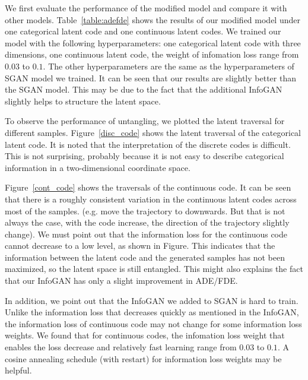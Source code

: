 We first evaluate the performance of the modified model and compare it with other models. Table~\ref{table:adefde} shows the results of our modified model under one categorical latent code and one continuous latent codes. We trained our model with the following hyperparameters: one categorical latent code with three dimensions, one continuous latent code, the weight of infomation loss range from $0.03$ to $0.1$. The other hyperparameters are the same as the hyperparameters of SGAN model we trained. It can be seen that our results are slightly better than the SGAN model. This may be due to the fact that the additional InfoGAN slightly helps to structure the latent space.


To observe the performance of untangling, we plotted the latent traversal for different samples. Figure~\ref{disc_code} shows the latent traversal of the categorical latent code. It is noted that the interpretation of the discrete codes is difficult. This is not surprising, probably because it is not easy to describe categorical information in a two-dimensional coordinate space.

Figure~\ref{cont_code} shows the traversals of the continuous code. It can be seen that there is a roughly consistent variation in the continuous latent codes across most of the samples. (e.g. move the trajectory to downwards. But that is not always the case, with the code increase, the direction of the trajectory slightly change). We must point out that the information loss for the continuous code cannot decrease to a low level, as shown in Figure. This indicates that the information between the latent code and the generated samples has not been maximized, so the latent space is still entangled. This might also explains the fact that our InfoGAN has only a slight improvement in ADE/FDE.


In addition, we point out that the InfoGAN we added to SGAN is hard to train. Unlike the information loss that decreases quickly as mentioned in the InfoGAN, the information loss of continuous code may not change for some information loss weights. We found that for continuous codes, the infomation loss weight that enables the loss decrease and relatively fast learning  range from $0.03$ to $0.1$. A cosine annealing schedule (with restart) for information loss weights may be helpful.

